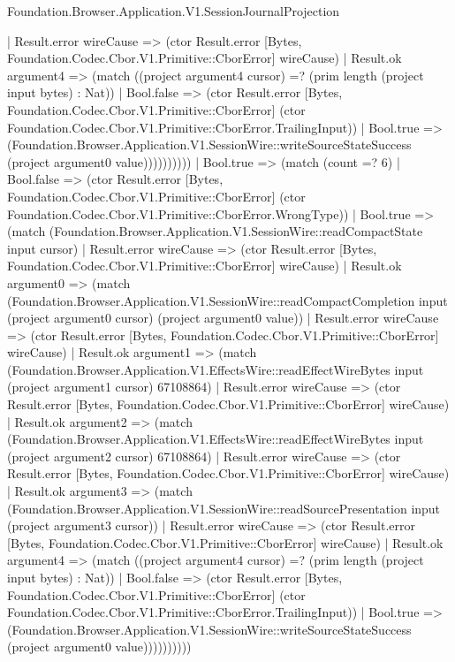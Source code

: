 \begin{lexlean}{Foundation.Browser.Application.V1.SessionJournalProjection}
\begin{semanticmodule}
{                        | Result.error wireCause => (ctor Result.error [Bytes, Foundation.Codec.Cbor.V1.Primitive::CborError] wireCause)
                        | Result.ok argument4 => (match ((project argument4 cursor) =? (prim length (project input bytes) : Nat))
                          | Bool.false => (ctor Result.error [Bytes, Foundation.Codec.Cbor.V1.Primitive::CborError] (ctor Foundation.Codec.Cbor.V1.Primitive::CborError.TrailingInput))
                          | Bool.true => (Foundation.Browser.Application.V1.SessionWire::writeSourceStateSuccess (project argument0 value))))))))))
          | Bool.true => (match (count =? 6)
            | Bool.false => (ctor Result.error [Bytes, Foundation.Codec.Cbor.V1.Primitive::CborError] (ctor Foundation.Codec.Cbor.V1.Primitive::CborError.WrongType))
            | Bool.true => (match (Foundation.Browser.Application.V1.SessionWire::readCompactState input cursor)
              | Result.error wireCause => (ctor Result.error [Bytes, Foundation.Codec.Cbor.V1.Primitive::CborError] wireCause)
              | Result.ok argument0 => (match (Foundation.Browser.Application.V1.SessionWire::readCompactCompletion input (project argument0 cursor) (project argument0 value))
                | Result.error wireCause => (ctor Result.error [Bytes, Foundation.Codec.Cbor.V1.Primitive::CborError] wireCause)
                | Result.ok argument1 => (match (Foundation.Browser.Application.V1.EffectsWire::readEffectWireBytes input (project argument1 cursor) 67108864)
                  | Result.error wireCause => (ctor Result.error [Bytes, Foundation.Codec.Cbor.V1.Primitive::CborError] wireCause)
                  | Result.ok argument2 => (match (Foundation.Browser.Application.V1.EffectsWire::readEffectWireBytes input (project argument2 cursor) 67108864)
                    | Result.error wireCause => (ctor Result.error [Bytes, Foundation.Codec.Cbor.V1.Primitive::CborError] wireCause)
                    | Result.ok argument3 => (match (Foundation.Browser.Application.V1.SessionWire::readSourcePresentation input (project argument3 cursor))
                      | Result.error wireCause => (ctor Result.error [Bytes, Foundation.Codec.Cbor.V1.Primitive::CborError] wireCause)
                      | Result.ok argument4 => (match ((project argument4 cursor) =? (prim length (project input bytes) : Nat))
                        | Bool.false => (ctor Result.error [Bytes, Foundation.Codec.Cbor.V1.Primitive::CborError] (ctor Foundation.Codec.Cbor.V1.Primitive::CborError.TrailingInput))
                        | Bool.true => (Foundation.Browser.Application.V1.SessionWire::writeSourceStateSuccess (project argument0 value))))))))))
}
\end{semanticmodule}
\end{lexlean}
